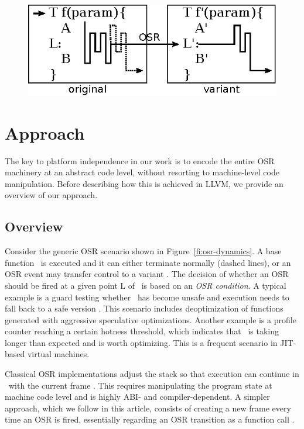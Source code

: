 
\ifdefined\noauthorea
\begin{figure}[t]
\begin{center}
\includegraphics[width=0.6\columnwidth]{figures/overview-osr/overview-osr.eps}
\caption{\protect}
\end{center}
\end{figure}
\fi

\section{Approach}
\label{se:approach}

The key to platform independence in our work is to encode the entire OSR machinery at an abstract code level, without resorting to machine-level code manipulation. Before describing how this is achieved in LLVM, we provide an overview of our approach.

\subsection{Overview}
\label{ss:overview}

Consider the generic OSR scenario shown in Figure~\ref{fi:osr-dynamics}. A base function \fbase\ is executed and it can either terminate normally (dashed lines), or an OSR event may transfer control to a variant \fvariant. The decision of whether an OSR should be fired at a given point \textsf{L} of \fbase\ is based on an {\em OSR condition}. A typical example is a guard testing whether \fbase\ has become unsafe and execution needs to fall back to a safe version \fvariant. This scenario includes deoptimization of functions generated with aggressive speculative optimizations. Another example is a profile counter reaching a certain hotness threshold, which indicates that \fbase\ is taking longer than expected and is worth optimizing. This is a frequent scenario in JIT-based virtual machines.

Classical OSR implementations adjust the stack so that execution can continue in \fvariant\ with the current frame . This requires manipulating the program state at machine code level and is highly ABI- and compiler-dependent. A simpler approach, which we follow in this article, consists of creating a new frame every time an OSR is fired, essentially regarding an OSR transition as a function call . 

